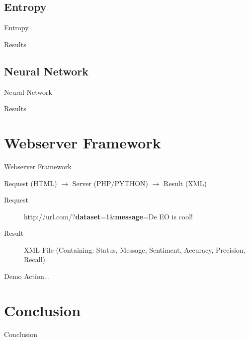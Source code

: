 \documentclass{beamer}
\begin{document}
\subsection{Entropy}
\begin{frame}{Entropy}
\end{frame}
\begin{frame}{Results}
\end{frame}

\subsection{Neural Network}
\begin{frame}{Neural Network}
\end{frame}
\begin{frame}{Results}
\end{frame}

\section{Webserver Framework}
\begin{frame}{Webserver Framework}
\begin{center}
Request (HTML) $\rightarrow$ Server (PHP/PYTHON) $\rightarrow$ Result (XML)
\end{center}

\begin{description}
\item[Request] http://url.com/?\textbf{dataset}=1&\textbf{message}=De EO is cool!\\
\item[Result] XML File (Containing: Status, Message, Sentiment, Accuracy, Precision, Recall)
\end{description}
\end{frame}
\begin{frame}{Demo}
Action...
\end{frame}

\section{Conclusion}

\begin{frame}{Conclusion}
\end{frame}
\end{document}
